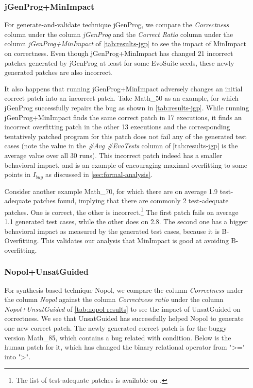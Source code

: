 \documentclass[]{sig-alternate}
\begin{document}
\subsubsection{jGenProg+MinImpact}
For generate-and-validate technique jGenProg, we compare the \emph{Correctness} column under the column \emph{jGenProg} and the \emph{Correct Ratio} column under the column \emph{jGenProg+\-MinImpact} of \autoref{tab:results-jgp} to see the impact of MinImpact on correctness. Even though jGenProg+MinImpact has changed 21 incorrect patches generated by jGenProg at least for some EvoSuite seeds, these newly generated patches are also incorrect. 

It also happens that running jGenProg+MinImpact adversely changes an initial correct patch into an incorrect patch. Take Math\_50 as an example, for which jGenProg successfully repairs the bug as shown in \autoref{tab:results-jgp}. While running jGenProg+MinImpact finds the same correct patch in 17 executions, it finds an incorrect overfitting patch in the other 13 executions and the corresponding tentatively patched program for this patch does not fail any of the generated test cases (note the value in the \emph{\#Avg \#EvoTests} column of \autoref{tab:results-jgp} is the average value over all 30 runs). This incorrect patch indeed has a smaller behavioral impact, and is an example of encouraging maximal overfitting to some points in $I_{bug}$ as discussed in \autoref{sec:formal-analysis}.

Consider another example Math\_70, for which there are on average 1.9 test-adequate patches found, implying that there are commonly 2 test-adequate patches.
One is correct, the other is incorrect.\footnote{The list of test-adequate patches is available on \cite{replication-site}.}
The first patch fails on average 1.1 generated test cases, while the other does on 2.8.  
The second one has a bigger behavioral impact as measured by the generated test cases, because it is B-Overfitting.
This validates our analysis that MinImpact is good at avoiding B-overfitting.

\subsubsection{Nopol+UnsatGuided}

For synthesis-based technique Nopol, we compare the column \emph{Correctness} under the column \emph{Nopol} against the column \emph{Correctness ratio} under the column \emph{Nopol+UnsatGuided} of \autoref{tab:nopol-results} to see the impact of UnsatGuided on correctness. We see that UnsatGuided has successfully helped Nopol to generate one new correct patch. The newly generated correct patch is for the buggy version Math\_85, which contains a bug related with condition. Below is the human patch for it, which has changed the binary relational operator from ">=" into ">".
\end{document}
